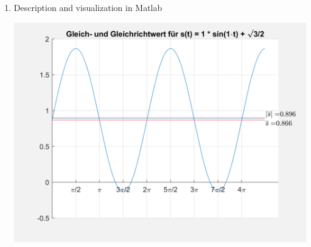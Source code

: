 \begin{enumerate}
	\item Description and visualization in Matlab
	
	{
		\setlength{\fboxsep}{0pt}%
		\colorbox{backcolor}{\includegraphics[width=\linewidth, keepaspectratio]{./assets/417.png}}
	}	
\end{enumerate}
\clearpage